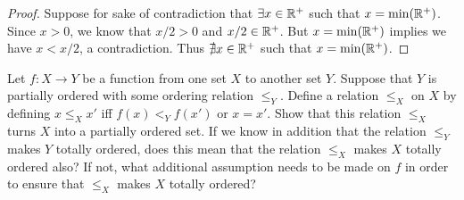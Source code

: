 \begin{proof}
  Suppose for sake of contradiction that \(\exists x \in \mathbb{R}^+\) such that \(x = \min(\mathbb{R}^+)\).
  Since \(x > 0\), we know that \(x / 2 > 0\) and \(x / 2 \in \mathbb{R}^+\).
  But \(x = \min(\mathbb{R}^+)\) implies we have \(x < x / 2\), a contradiction.
  Thus \(\nexists x \in \mathbb{R}^+\) such that \(x = \min(\mathbb{R}^+)\).
\end{proof}

\begin{ex}\label{ex:8.5.5}
  Let \(f : X \to Y\) be a function from one set \(X\) to another set \(Y\).
  Suppose that \(Y\) is partially ordered with some ordering relation \(\leq_Y\).
  Define a relation \(\leq_X\) on \(X\) by defining \(x \leq_X x'\) iff \(f(x) <_Y f(x')\) or \(x = x'\).
  Show that this relation \(\leq_X\) turns \(X\) into a partially ordered set.
  If we know in addition that the relation \(\leq_Y\) makes \(Y\) totally ordered, does this mean that the relation \(\leq_X\) makes \(X\) totally ordered also?
  If not, what additional assumption needs to be made on \(f\) in order to ensure that \(\leq_X\) makes \(X\) totally ordered?
\end{ex}

